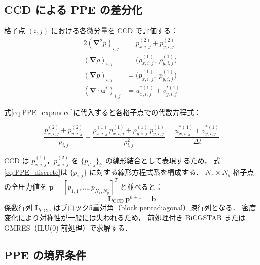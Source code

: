\documentclass[12pt, a4paper, titlepage]{article}
\newcommand{\jp}[1]{{\normalfont\jpfont #1}}
\newcommand{\bu}{\bm{u}}
\newcommand{\bnabla}{\bm{\nabla}}
\begin{document}
\subsection{CCD \jp{による PPE の差分化}}

\jp{格子点 $(i,j)$ における各微分量を CCD で評価する：}
\begin{alignat}{2}
  (\bnabla^2 p)_{i,j}
    &= p^{(2)}_{x,i,j} + p^{(2)}_{y,i,j}
  \\[3pt]
  (\bnabla\rho)_{i,j}
    &= \bigl(\rho^{(1)}_{x,i,j},\; \rho^{(1)}_{y,i,j}\bigr)
  \\[3pt]
  (\bnabla p)_{i,j}
    &= \bigl(p^{(1)}_{x,i,j},\; p^{(1)}_{y,i,j}\bigr)
  \\[3pt]
  (\bnabla\cdot\bu^*)_{i,j}
    &= u^{*(1)}_{x,i,j} + v^{*(1)}_{y,i,j}
\end{alignat}

\jp{式\eqref{eq:PPE_expanded}に代入すると各格子点での代数方程式：}

\begin{tcolorbox}[mybox, title={\jp{離散化された圧力 Poisson 方程式（CCD 版）}}]
\begin{equation}
  \frac{p^{(2)}_{x,i,j} + p^{(2)}_{y,i,j}}{\rho_{i,j}}
  - \frac{
      \rho^{(1)}_{x,i,j}\,p^{(1)}_{x,i,j}
    + \rho^{(1)}_{y,i,j}\,p^{(1)}_{y,i,j}
  }{\rho_{i,j}^2}
  = \frac{u^{*(1)}_{x,i,j} + v^{*(1)}_{y,i,j}}{\Delta t}
  \label{eq:PPE_discrete}
\end{equation}
\end{tcolorbox}

\jp{CCD は $p^{(1)}_{x,i,j}$，$p^{(2)}_{x,i,j}$ を $\{p_{i',j}\}_{i'}$ の線形結合として表現するため，
式\eqref{eq:PPE_discrete}は $\{p_{i,j}\}$ に対する線形方程式系を構成する．
$N_x\times N_y$ 格子点の全圧力値を
$\bm{p} = [p_{1,1},\ldots,p_{N_x,N_y}]^T$ と並べると：}
\begin{equation}
  \bm{L}_{\mathrm{CCD}}\,\bm{p}^{n+1} = \bm{b}
  \label{eq:PPE_linear_system}
\end{equation}
\jp{係数行列 $\bm{L}_{\mathrm{CCD}}$ はブロック5重対角（block pentadiagonal）疎行列となる．
密度変化により対称性が一般には失われるため，
前処理付き BiCGSTAB または GMRES（ILU(0) 前処理）で求解する．}

\subsection{PPE \jp{の境界条件}}
\end{document}
